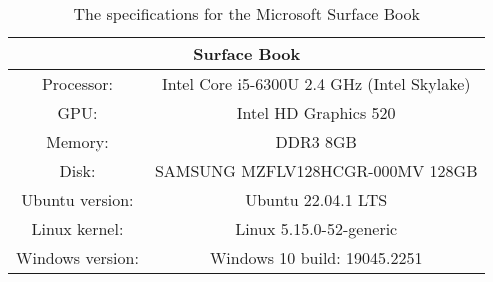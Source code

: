 \begin{table}[H]
    \centering
    \begin{tabular}{|| c | c ||}
    \hline
    \multicolumn{2}{||c||}{Surface Book}           \\ [0.5ex] \hline\hline
    Processor:      & Intel Core i5-6300U 2.4 GHz (Intel Skylake)      \\
    GPU:            & Intel HD Graphics 520          \\
    Memory:         & DDR3 8GB                         \\
    Disk:           & SAMSUNG MZFLV128HCGR-000MV 128GB \\
    Ubuntu version:  & Ubuntu 22.04.1 LTS                \\
    Linux kernel: & Linux 5.15.0-52-generic       \\
    Windows version:& Windows 10 build: 19045.2251 \\ \hline
    \end{tabular}
    \caption{The specifications for the Microsoft Surface Book}
    \label{tab:surfaceBook}
\end{table} 